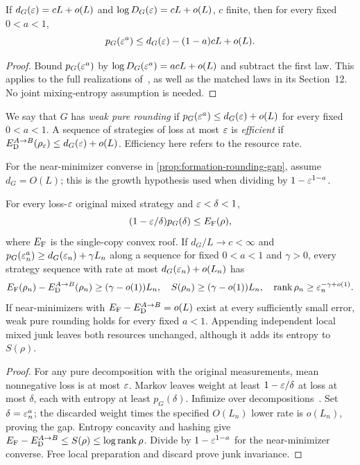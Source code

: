 \begin{proposition}\label{prop:matched-weak-rounding}
If $d_G(\varepsilon)=cL+o(L)$ and $\log D_G(\varepsilon)=cL+o(L)$, $c$ finite, then for every fixed $0<a<1$,
\[
 p_G(\varepsilon^a)\le d_G(\varepsilon)-(1-a)cL+o(L).
\]
\end{proposition}
\begin{proof}
Bound $p_G(\varepsilon^a)$ by $\log D_G(\varepsilon^a)=acL+o(L)$ and subtract the first law. This applies to the full realizations of~\cite[Theorem~16.6 and Corollary~16.7]{DM-U3}, as well as the matched laws in its Section~12. No joint mixing-entropy assumption is needed.
\end{proof}

We say that $G$ has \emph{weak pure rounding} if $p_G(\varepsilon^a)\le d_G(\varepsilon)+o(L)$ for every fixed $0<a<1$. A sequence of strategies of loss at most $\varepsilon$ is \emph{efficient} if $E_{\mathrm D}^{A\to B}(\rho_\varepsilon)\le d_G(\varepsilon)+o(L)$. Efficiency here refers to the resource rate.

For the near-minimizer converse in \cref{prop:formation-rounding-gap}, assume $d_G=O(L)$; this is the growth hypothesis used when dividing by $1-\varepsilon^{1-a}$.

\begin{proposition}\label{prop:formation-rounding-gap}
For every loss-$\varepsilon$ original mixed strategy and $\varepsilon<\delta<1$,
\[
 (1-\varepsilon/\delta)p_G(\delta)\le E_{\mathrm F}(\rho),
\]
where $E_{\mathrm F}$ is the single-copy convex roof. If $d_G/L\to c<\infty$ and $p_G(\varepsilon_n^a)\ge d_G(\varepsilon_n)+\gamma L_n$ along a sequence for fixed $0<a<1$ and $\gamma>0$, every strategy sequence with rate at most $d_G(\varepsilon_n)+o(L_n)$ has
\[
 E_{\mathrm F}(\rho_n)-E_{\mathrm D}^{A\to B}(\rho_n)\ge(\gamma-o(1))L_n,\quad
 S(\rho_n)\ge(\gamma-o(1))L_n,\quad
 \operatorname{rank}\rho_n\ge\varepsilon_n^{-\gamma+o(1)}.
\]
If near-minimizers with $E_{\mathrm F}-E_{\mathrm D}^{A\to B}=o(L)$ exist at every sufficiently small error, weak pure rounding holds for every fixed $a<1$. Appending independent local mixed junk leaves both resources unchanged, although it adds its entropy to $S(\rho)$.
\end{proposition}
\begin{proof}
For any pure decomposition with the original measurements, mean nonnegative loss is at most $\varepsilon$. Markov leaves weight at least $1-\varepsilon/\delta$ at loss at most $\delta$, each with entropy at least $p_G(\delta)$. Infimize over decompositions~\cite{BDSW96}. Set $\delta=\varepsilon_n^a$; the discarded weight times the specified $O(L_n)$ lower rate is $o(L_n)$, proving the gap. Entropy concavity and hashing give $E_{\mathrm F}-E_{\mathrm D}^{A\to B}\le S(\rho)\le\log\operatorname{rank}\rho$. Divide by $1-\varepsilon^{1-a}$ for the near-minimizer converse. Free local preparation and discard prove junk invariance.
\end{proof}

